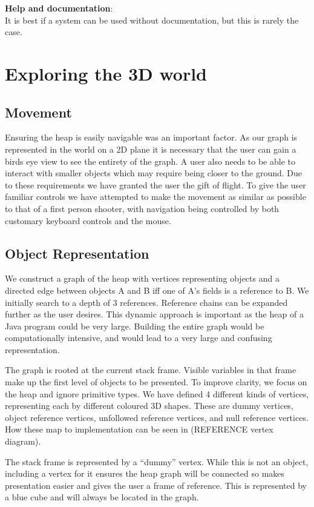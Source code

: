 \documentclass[11pt, a4paper]{report}
\begin{document}
{\bfseries Help and documentation}: \\
It is best if a system can be used without documentation, but this is rarely the case.

\section{Exploring the 3D world}

\subsection{Movement}

Ensuring the heap is easily navigable was an important factor. As our graph is represented in the world on a 2D plane it is necessary that the user can gain a birds eye view to see the entirety of the graph. A user also needs to be able to interact with smaller objects which may require being closer to the ground. Due to these requirements we have granted the user the gift of flight. To give the user familiar controls we have attempted to make the movement as similar as possible to that of a first person shooter, with navigation being controlled by both customary keyboard controls and the mouse. 

\subsection{Object Representation}

We construct a graph of the heap with vertices representing objects and a directed edge between objects A and B iff one of A’s fields is a reference to B. We initially search to a depth of 3 references. Reference chains can be expanded further as the user desires. This dynamic approach is important as the heap of a Java program could be very large. Building the entire graph would be computationally intensive, and would lead to a very large and confusing representation.

The graph is rooted at the current stack frame. Visible variables in that frame make up the first level of objects to be presented. To improve clarity, we focus on the heap and ignore primitive types. We have defined 4 different kinds of vertices, representing each by different coloured 3D shapes. These are dummy vertices, object reference vertices, unfollowed reference vertices, and null reference vertices. How these map to implementation can be seen in (REFERENCE vertex diagram).

The stack frame is represented by a “dummy” vertex. While this is not an object, including a vertex for it ensures the heap graph will be connected so makes presentation easier and gives the user a frame of reference. This is represented by a blue cube and will always be located in the graph.
\end{document}
